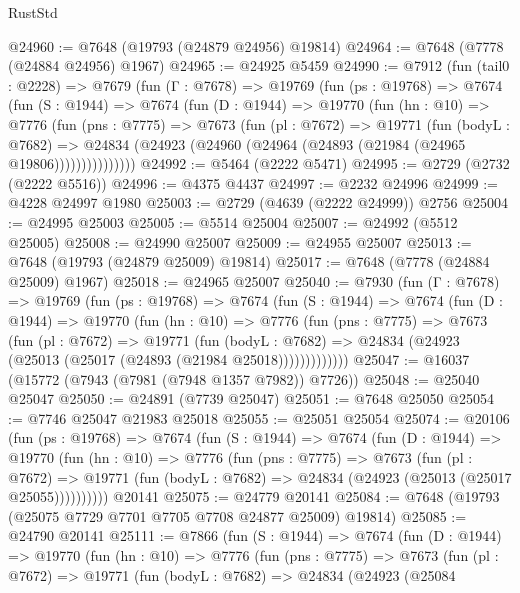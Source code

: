 \begin{lexlean}{RustStd}
\begin{coremodule}
@24960 := @7648 (@19793 (@24879 @24956) @19814)
@24964 := @7648 (@7778 (@24884 @24956) @1967)
@24965 := @24925 @5459
@24990 := @7912
    (fun (tail0 : @2228) =>
    @7679
      (fun (Γ : @7678) =>
      @19769
        (fun (ps : @19768) =>
        @7674
          (fun (S : @1944) =>
          @7674
            (fun (D : @1944) =>
            @19770
              (fun (hn : @10) =>
              @7776
                (fun (pns : @7775) =>
                @7673
                  (fun (pl : @7672) =>
                  @19771
                    (fun (bodyL : @7682) =>
                    @24834 (@24923 (@24960 (@24964 (@24893 (@21984 (@24965 @19806)))))))))))))))
@24992 := @5464 (@2222 @5471)
@24995 := @2729 (@2732 (@2222 @5516))
@24996 := @4375 @4437
@24997 := @2232 @24996
@24999 := @4228 @24997 @1980
@25003 := @2729 (@4639 (@2222 @24999)) @2756
@25004 := @24995 @25003
@25005 := @5514 @25004
@25007 := @24992 (@5512 @25005)
@25008 := @24990 @25007
@25009 := @24955 @25007
@25013 := @7648 (@19793 (@24879 @25009) @19814)
@25017 := @7648 (@7778 (@24884 @25009) @1967)
@25018 := @24965 @25007
@25040 := @7930
    (fun (Γ : @7678) =>
    @19769
      (fun (ps : @19768) =>
      @7674
        (fun (S : @1944) =>
        @7674
          (fun (D : @1944) =>
          @19770
            (fun (hn : @10) =>
            @7776
              (fun (pns : @7775) =>
              @7673
                (fun (pl : @7672) =>
                @19771
                  (fun (bodyL : @7682) =>
                  @24834 (@24923 (@25013 (@25017 (@24893 (@21984 @25018)))))))))))))
@25047 := @16037 (@15772 (@7943 (@7981 (@7948 @1357 @7982)) @7726))
@25048 := @25040 @25047
@25050 := @24891 (@7739 @25047)
@25051 := @7648 @25050
@25054 := @7746 @25047 @21983 @25018
@25055 := @25051 @25054
@25074 := @20106
    (fun (ps : @19768) =>
    @7674
      (fun (S : @1944) =>
      @7674
        (fun (D : @1944) =>
        @19770
          (fun (hn : @10) =>
          @7776
            (fun (pns : @7775) =>
            @7673
              (fun (pl : @7672) =>
              @19771 (fun (bodyL : @7682) => @24834 (@24923 (@25013 (@25017 @25055))))))))))
    @20141
@25075 := @24779 @20141
@25084 := @7648 (@19793 (@25075 @7729 @7701 @7705 @7708 @24877 @25009) @19814)
@25085 := @24790 @20141
@25111 := @7866
    (fun (S : @1944) =>
    @7674
      (fun (D : @1944) =>
      @19770
        (fun (hn : @10) =>
        @7776
          (fun (pns : @7775) =>
          @7673
            (fun (pl : @7672) =>
            @19771
              (fun (bodyL : @7682) =>
              @24834
                (@24923
                  (@25084

\end{coremodule}
\end{lexlean}
